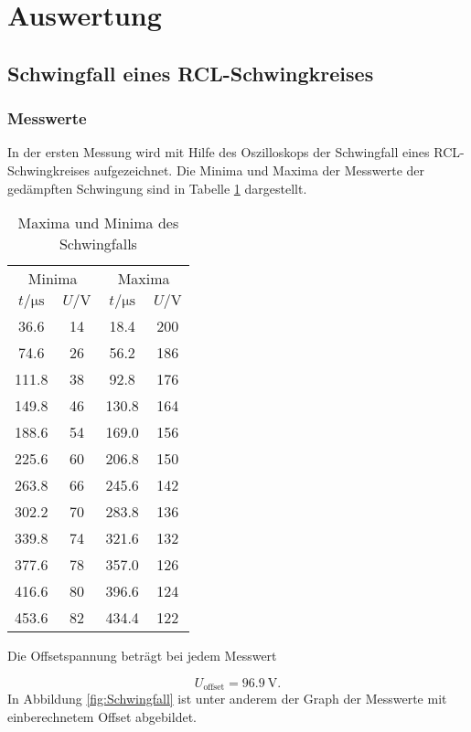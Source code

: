 \section{Auswertung}
\label{sec:Auswertung}

\subsection{Schwingfall eines RCL-Schwingkreises}


\subsubsection{Messwerte}

In der ersten Messung wird mit Hilfe des Oszilloskops der Schwingfall eines
RCL-Schwingkreises aufgezeichnet. Die Minima und Maxima der Messwerte der
gedämpften Schwingung sind in Tabelle \ref{tab:Schwingfall} dargestellt.

\begin{table}[h]
  \centering
  \begin{tabular}{c c c c}
    \toprule
    \multicolumn{2}{c}{Minima} & \multicolumn{2}{c}{Maxima} \\
    $t/\si{\micro\second}$ & $U/\si{\V}$
    & $t/\si{\micro\second}$ & $U/\si{\V}$  \\
    \midrule
    36.6 & 14 & 18.4 & 200 \\
    74.6 & 26 & 56.2 & 186 \\
    111.8 & 38 & 92.8 & 176 \\
    149.8 & 46 & 130.8 & 164 \\
    188.6 & 54 & 169.0 & 156 \\
    225.6 & 60 & 206.8 & 150 \\
    263.8 & 66 & 245.6 & 142 \\
    302.2 & 70 & 283.8 & 136 \\
    339.8 & 74 & 321.6 & 132 \\
    377.6 & 78 & 357.0 & 126 \\
    416.6 & 80 & 396.6 & 124 \\
    453.6 & 82 & 434.4 & 122 \\
    \bottomrule
  \end{tabular}
  \caption{Maxima und Minima des Schwingfalls}
  \label{tab:Schwingfall}
\end{table}

Die Offsetspannung beträgt bei jedem Messwert

\begin{equation}
  U_\text{offset} = \SI{96.9}{\V}.
\end{equation}
In Abbildung \ref{fig:Schwingfall} ist unter anderem der Graph der Messwerte
mit einberechnetem Offset abgebildet.

